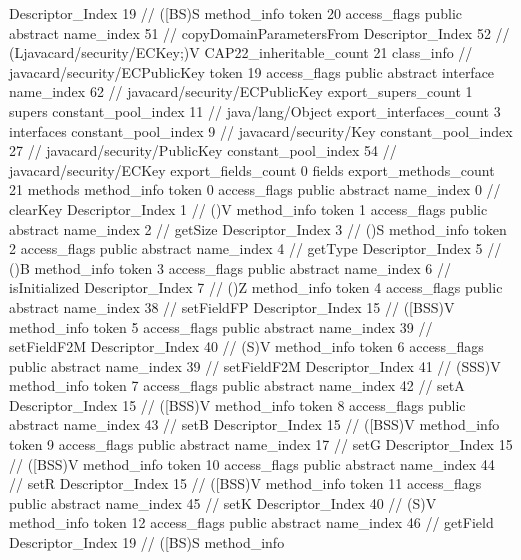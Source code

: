 {{{{{					Descriptor_Index	19		// ([BS)S
				}
				method_info {
					token	20
					access_flags	public abstract
					name_index	51		// copyDomainParametersFrom
					Descriptor_Index	52		// (Ljavacard/security/ECKey;)V
				}
			}
			CAP22_inheritable_count	21
		}
		class_info {		// javacard/security/ECPublicKey
			token	19
			access_flags	public abstract interface
			name_index	62		// javacard/security/ECPublicKey
			export_supers_count	1
			supers {
				constant_pool_index	11		// java/lang/Object
			}
			export_interfaces_count	3
			interfaces {
				constant_pool_index	9		// javacard/security/Key
				constant_pool_index	27		// javacard/security/PublicKey
				constant_pool_index	54		// javacard/security/ECKey
			}
			export_fields_count	0
			fields {
			}
			export_methods_count	21
			methods {
				method_info {
					token	0
					access_flags	public abstract
					name_index	0		// clearKey
					Descriptor_Index	1		// ()V
				}
				method_info {
					token	1
					access_flags	public abstract
					name_index	2		// getSize
					Descriptor_Index	3		// ()S
				}
				method_info {
					token	2
					access_flags	public abstract
					name_index	4		// getType
					Descriptor_Index	5		// ()B
				}
				method_info {
					token	3
					access_flags	public abstract
					name_index	6		// isInitialized
					Descriptor_Index	7		// ()Z
				}
				method_info {
					token	4
					access_flags	public abstract
					name_index	38		// setFieldFP
					Descriptor_Index	15		// ([BSS)V
				}
				method_info {
					token	5
					access_flags	public abstract
					name_index	39		// setFieldF2M
					Descriptor_Index	40		// (S)V
				}
				method_info {
					token	6
					access_flags	public abstract
					name_index	39		// setFieldF2M
					Descriptor_Index	41		// (SSS)V
				}
				method_info {
					token	7
					access_flags	public abstract
					name_index	42		// setA
					Descriptor_Index	15		// ([BSS)V
				}
				method_info {
					token	8
					access_flags	public abstract
					name_index	43		// setB
					Descriptor_Index	15		// ([BSS)V
				}
				method_info {
					token	9
					access_flags	public abstract
					name_index	17		// setG
					Descriptor_Index	15		// ([BSS)V
				}
				method_info {
					token	10
					access_flags	public abstract
					name_index	44		// setR
					Descriptor_Index	15		// ([BSS)V
				}
				method_info {
					token	11
					access_flags	public abstract
					name_index	45		// setK
					Descriptor_Index	40		// (S)V
				}
				method_info {
					token	12
					access_flags	public abstract
					name_index	46		// getField
					Descriptor_Index	19		// ([BS)S
				}
				method_info {
}}}}}
